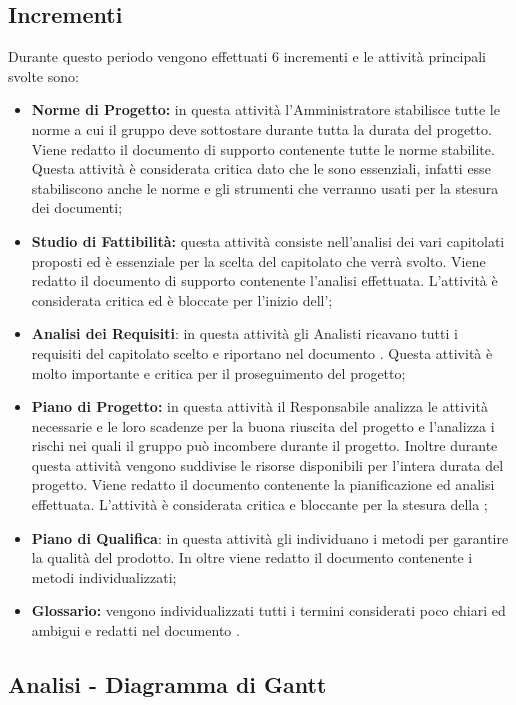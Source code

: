 \documentclass[PianoDiProgetto.tex]{subfiles}
\begin{document}
\subsection{Incrementi}
Durante questo periodo vengono effettuati 6 incrementi e le attività principali svolte sono:
\begin{itemize}
	\item \textbf{Norme di Progetto:}
	in questa attività l'Amministratore stabilisce tutte le norme a cui il gruppo \gruppo deve sottostare durante tutta la durata del progetto. Viene redatto il documento di supporto \ndp contenente tutte le norme stabilite. Questa attività è considerata critica dato che le \ndp sono essenziali, infatti esse stabiliscono anche le norme e gli strumenti che verranno usati per la stesura dei documenti;
	
	
	\item \textbf{Studio di Fattibilità:} 
	questa attività consiste nell'analisi dei vari capitolati proposti ed è essenziale per la scelta del capitolato che verrà svolto. Viene redatto il documento di supporto \sdf contenente l'analisi effettuata. L'attività è considerata critica ed è bloccate per l'inizio dell'\adr;
		
	\item \textbf{Analisi dei Requisiti}: 
		in questa attività gli Analisti ricavano tutti i requisiti del capitolato scelto e riportano nel documento \adr. Questa attività è molto importante e critica per il proseguimento del progetto;
	
	\item \textbf{Piano di Progetto:} in questa attività il Responsabile analizza le attività necessarie e le loro scadenze per la buona riuscita del progetto e l'\amme analizza i rischi nei quali il gruppo \gruppo può incombere durante il progetto.  Inoltre durante questa attività vengono suddivise le risorse disponibili per l'intera durata del progetto. Viene redatto il documento \pdp contenente la pianificazione ed analisi effettuata. L'attività è considerata critica e bloccante per la stesura della ;
	\item \textbf{Piano di Qualifica}: in questa attività gli \ammi individuano i metodi per garantire la qualità del prodotto. In oltre viene redatto il documento \pdq contenente i metodi individualizzati;
	\item \textbf{Glossario:} vengono individualizzati tutti i termini considerati poco chiari ed ambigui e redatti nel documento \g.
		
\end{itemize}	 
\begin{landscape}
\subsection{Analisi - Diagramma di Gantt}
\end{landscape}	
\end{document}
